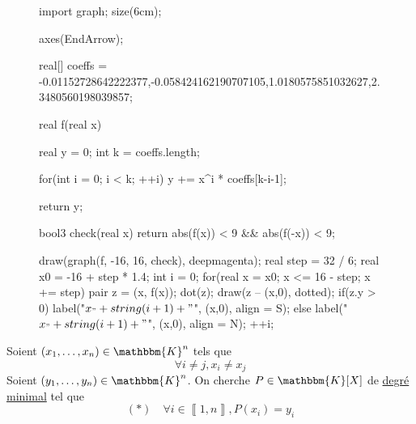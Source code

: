 \begin{exo}
	[Problème]
	
	\begin{wrapfigure}
		{r}{6cm}
		\centering
		\begin{asy}
			import graph;
			size(6cm);

			axes(EndArrow);

			real[] coeffs = {-0.01152728642222377,-0.058424162190707105,1.0180575851032627,2.3480560198039857};

			real f(real x) {
				real y = 0;
				int k = coeffs.length;

				for(int i = 0; i < k; ++i) {
					y += x^i * coeffs[k-i-1];
				}

				return y;
			}

			bool3 check(real x) {return abs(f(x)) < 9 && abs(f(-x)) < 9;}

			draw(graph(f, -16, 16, check), deepmagenta);
			real step = 32 / 6;
			real x0 = -16 + step * 1.4;
			int i = 0;
			for(real x = x0; x <= 16 - step; x += step) {
				pair z = (x, f(x));
				dot(z);
				draw(z -- (x,0), dotted);
				if(z.y > 0)
					label("$\small x_" + string(i + 1) + "$", (x,0), align = S);
				else
					label("$\small x_" + string(i + 1) + "$", (x,0), align = N);
				++i;
			}
		\end{asy}
	\end{wrapfigure}

	Soient $(x_1, \ldots, x_n) \in \mathbbm{K}^n$ tels que \[
		\forall i \neq j, x_i \neq x_j
	\] Soient $(y_1, \ldots, y_n) \in \mathbbm{K}^n$.
	On cherche $P \in \mathbbm{K}[X]$ de \underline{degré minimal} tel que \[
		(*) \quad \forall i \in \left\llbracket 1,n \right\rrbracket, P(x_i) = y_i
	\]


\end{exo}

